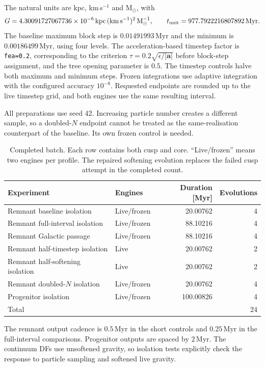 \documentclass[11pt,a4paper]{article}
\newcommand{\Msun}{\mathrm{M}_{\odot}}
\newcommand{\Myr}{\,\mathrm{Myr}}
\begin{document}
The natural units are kpc, km\,s$^{-1}$ and $\Msun$, with
\begin{equation}
 G=4.30091727067736\times10^{-6}\,
 \mathrm{kpc\,(km\,s^{-1})^2}\,\Msun^{-1},\qquad
 t_{\rm unit}=977.7922216807892\Myr .
\end{equation}
The baseline maximum block step is $0.01491993\Myr$ and the minimum is
$0.00186499\Myr$, using four levels. The acceleration-based timestep factor
is \texttt{fea=0.2}, corresponding to the criterion
$\tau=0.2\sqrt{\epsilon/|\mathbf a|}$ before block-step assignment, and the
tree opening parameter is $0.5$. The timestep controls halve both
maximum and minimum steps. Frozen integrations use adaptive integration with
the configured accuracy $10^{-8}$. Requested endpoints are rounded up to the
live timestep grid, and both engines use the same resulting interval.

All preparations use seed 42. Increasing particle number creates a different
sample, so a doubled-$N$ endpoint cannot be treated as the same-realisation
counterpart of the baseline. Its own frozen control is needed.

\begin{table}[htbp]
\centering\small
\caption{Completed batch. Each row contains both cusp and core. ``Live/frozen''
means two engines per profile. The repaired softening evolution replaces the
failed cusp attempt in the completed count.}
\label{tab:batch}
\begin{tabular}{llrr}
\toprule
Experiment & Engines & Duration [Myr] & Evolutions\\
\midrule
Remnant baseline isolation & Live/frozen & 20.00762 & 4\\
Remnant full-interval isolation & Live/frozen & 88.10216 & 4\\
Remnant Galactic passage & Live/frozen & 88.10216 & 4\\
Remnant half-timestep isolation & Live & 20.00762 & 2\\
Remnant half-softening isolation & Live & 20.00762 & 2\\
Remnant doubled-$N$ isolation & Live/frozen & 20.00762 & 4\\
Progenitor isolation & Live/frozen & 100.00826 & 4\\
\midrule
Total & & & 24\\
\bottomrule
\end{tabular}
\end{table}

The remnant output cadence is $0.5\Myr$ in the short controls and $0.25\Myr$
in the full-interval comparisons. Progenitor outputs are spaced by
$2\Myr$. The continuum DFs use unsoftened gravity, so isolation tests explicitly
check the response to particle sampling and softened live gravity.
\end{document}
